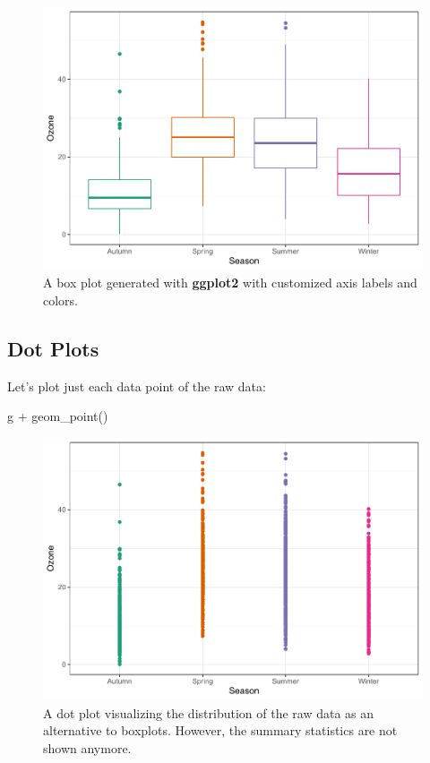 \documentclass[
]{krantz}
\makeatletter
\newenvironment{Shaded}{\begin{snugshade}}{\end{snugshade}}
\newcommand{\FunctionTok}[1]{\textcolor[rgb]{0,0,0}{#1}}
\newcommand{\NormalTok}[1]{#1}
\newcommand{\SpecialCharTok}[1]{\textcolor[rgb]{0,0,0}{#1}}
\newenvironment{kframe}{%
\medskip{}
\setlength{\fboxsep}{.8em}
 \def\at@end@of@kframe{}%
 \ifinner\ifhmode%
  \def\at@end@of@kframe{\end{minipage}}%
  \begin{minipage}{\columnwidth}%
 \fi\fi%
 \def\FrameCommand##1{\hskip\@totalleftmargin \hskip-\fboxsep
 \colorbox{shadecolor}{##1}\hskip-\fboxsep
     \hskip-\linewidth \hskip-\@totalleftmargin \hskip\columnwidth}%
 \MakeFramed {\advance\hsize-\width
   \@totalleftmargin\z@ \linewidth\hsize
   \@setminipage}}%
 {\par\unskip\endMakeFramed%
 \at@end@of@kframe}
\renewenvironment{Shaded}{\begin{kframe}}{\end{kframe}}
\makeatother
\begin{document}
\begin{figure}
\centering
\includegraphics{bookdown_files/figure-latex/boxplot-1.pdf}
\caption{\label{fig:boxplot}A box plot generated with \textbf{ggplot2} with customized axis labels and colors.}
\end{figure}

\hypertarget{dot-plots}{%
\subsection{Dot Plots}\label{dot-plots}}

Let's plot just each data point of the raw data:

\begin{Shaded}
\begin{Highlighting}[]
\NormalTok{g }\SpecialCharTok{+} \FunctionTok{geom\_point}\NormalTok{()}
\end{Highlighting}
\end{Shaded}

\begin{figure}
\centering
\includegraphics{bookdown_files/figure-latex/point-1.pdf}
\caption{\label{fig:point}A dot plot visualizing the distribution of the raw data as an alternative to boxplots. However, the summary statistics are not shown anymore.}
\end{figure}
\end{document}
